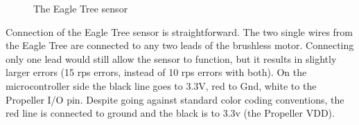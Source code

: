 \documentclass{article}
\numberwithin{equation}{section} %
\begin{document}
\begin{figure}[ht]
\centering
{}
\label{fig:subfigureExample}
\caption[Optional caption for list of figures]{The Eagle Tree sensor}
\end{figure}



Connection of the Eagle Tree sensor is straightforward. The two single wires from the Eagle Tree are connected to any two leads of the brushless motor. Connecting only one lead would still allow the sensor to function, but it results in slightly larger errors (15 rps errors, instead of 10 rps errors with both). On the microcontroller side the black line goes to 3.3V, red to Gnd, white to the Propeller I/O pin. Despite going against standard color coding conventions, the red line is connected to ground and the black is to 3.3v (the Propeller VDD). 
\end{document}
